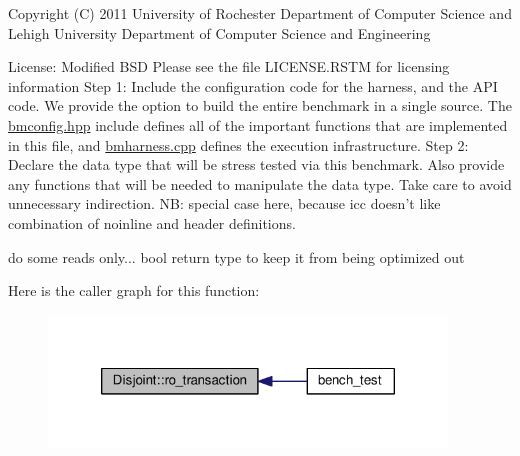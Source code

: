 Copyright (C) 2011 University of Rochester Department of Computer Science and Lehigh University Department of Computer Science and Engineering

License\-: Modified B\-S\-D Please see the file L\-I\-C\-E\-N\-S\-E.\-R\-S\-T\-M for licensing information Step 1\-: Include the configuration code for the harness, and the A\-P\-I code. We provide the option to build the entire benchmark in a single source. The \hyperlink{bmconfig_8hpp}{bmconfig.\-hpp} include defines all of the important functions that are implemented in this file, and \hyperlink{bmharness_8cpp}{bmharness.\-cpp} defines the execution infrastructure. Step 2\-: Declare the data type that will be stress tested via this benchmark. Also provide any functions that will be needed to manipulate the data type. Take care to avoid unnecessary indirection. N\-B\-: special case here, because icc doesn't like combination of noinline and header definitions.

do some reads only... bool return type to keep it from being optimized out 

Here is the caller graph for this function\-:
\nopagebreak
\begin{figure}[H]
\begin{center}
\leavevmode
\includegraphics[width=300pt]{structDisjoint_ac740b0c2eb2b55099ce7614a0d69f4ff_icgraph}
\end{center}
\end{figure}




